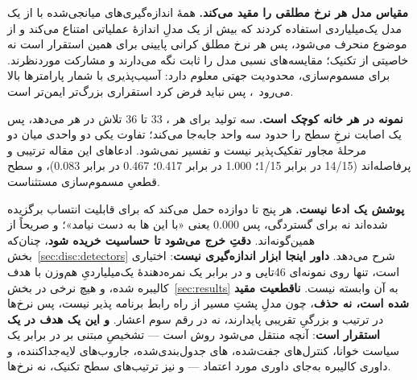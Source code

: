 \textbf{مقیاس مدل هر نرخ مطلقی را مقید می‌کند.} همهٔ اندازه‌گیری‌های
میانجی‌شده با  از یک مدل یک‌میلیاردی استفاده کردند که بیش از یک
مدلِ اندازهٔ عملیاتی امتناع می‌کند و از موضوع منحرف می‌شود، پس هر نرخ مطلق
کرانی پایینی برای همین استقرار است نه خاصیتی از تکنیک؛ مقایسه‌های نسبی
مدل را ثابت نگه می‌دارند و مشارکت موردنظرند. برای مسموم‌سازی، محدودیت
جهتی معلوم دارد: آسیب‌پذیری با شمار پارامترها بالا
می‌رود~\cite[]{bowen2025scaling}، پس نباید فرض کرد استقراری
بزرگ‌تر ایمن‌تر است.

\textbf{نمونه در هر خانه کوچک است.} سه تولید برای هر ،
\num{33} تا \num{36} تلاش در هر  می‌دهد، پس یک اصابت نرخِ سطح
 را حدود سه واحد جابه‌جا می‌کند؛ تفاوت یکی دو واحدی میان دو مرحلهٔ
مجاور تفکیک‌پذیر نیست و تفسیر نمی‌شود. ادعاهای این مقاله ترتیبی و
پرفاصله‌اند (\num{14/15} در برابر \num{1/15}؛ \num{1.000} در برابر
\num{0.417}؛ \num{0.467} در برابر \num{0.083})، و سطح قطعیِ مسموم‌سازی
مستثناست.

\textbf{پوشش یک ادعا نیست.} هر  پنج تا دوازده  حمل
می‌کند که برای قابلیت انتساب برگزیده شده‌اند نه برای گستردگی، پس
\num{0.000} یعنی «با این ‌ها به دست نیامد»؛  و
 صریحاً از همین‌گونه‌اند. \textbf{دقتِ
 خرج می‌شود تا حساسیت خریده شود}، چنان‌که
بخش~\ref{sec:disc:detectors} شرح می‌دهد. \textbf{داور اینجا ابزار
اندازه‌گیری نیست}: اختیاری است، تنها روی نمونه‌ای \num{46}‌تایی و در برابر
یک نمره‌دهندهٔ یک‌میلیاردیِ هم‌وزن با هدف کالیبره شده، و هیچ نرخی در
بخش~\ref{sec:results} به آن وابسته نیست. \textbf{ناقطعیت مقید شده است،
نه حذف}، چون مدلِ پشتِ مسیر  از راه رابط برنامه پذیر
نیست، پس نرخ‌ها در ترتیب و بزرگیِ تقریبی پایدارند، نه در رقم سوم اعشار.
\textbf{و این یک هدف در یک استقرار است}: آنچه منتقل می‌شود روش است ---
تشخیصِ مبتنی بر  در برابر یک سیاست خوانا، کنترل‌های
جفت‌شده، ‌های جدول‌بندی‌شده، جاروب‌های لایه‌جداکننده، و داوری
کالیبره به‌جای داوری مورد اعتماد --- و نیز ترتیب‌های سطح تکنیک، نه
نرخ‌ها.
